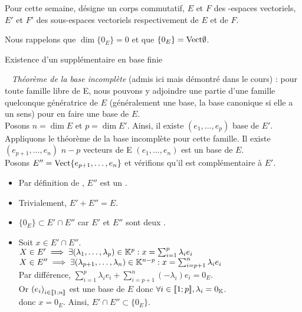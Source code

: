 \documentclass{article}
\date{22 Avril 2024}
\begin{document}
	\maketitle
	
	Pour cette semaine, \K désigne un corps commutatif, $E$ et $F$ des \K\!\!-espaces vectoriels, $E'$ et $F'$ des sous-espaces vectoriels respectivement de $E$ et de $F$.
	
	Nous rappelons que $\dim \{0_E\} = 0$ et que $\{0_E\} = \text{Vect} \emptyset$.
	
	\begin{question_kholle}
		{Existence d'un supplémentaire en base finie}
		
		~\newline
		\textit{Théorème de la base incomplète} (admis ici mais démontré dans le cours) : pour toute famille libre de E, nous pouvons y adjoindre une partie d'une famille quelconque génératrice de $E$ (généralement une base, la base canonique si elle a un sens) pour en faire une base de $E$. \\
		
		Posons $n = \dim E$ et $p = \dim E'$. Ainsi, il existe $(e_1, \ldots, e_p)$ base de $E'$. \\
		Appliquons le théorème de la base incomplète pour cette famille. Il existe $(e_{p+1}, \ldots, e_n)$ $n-p$ vecteurs de E \tq $(e_1, \ldots, e_n)$ est un base de $E$. \\
		Posons $E'' = \text{Vect} \{ e_{p+1}, \ldots, e_n \}$ et vérifions qu'il est complémentaire à $E'$.
		
		\begin{itemize}[label=$*$]
			\item Par définition de \Vect\!\!, $E''$ est un \sev.
			\item Trivialement, $E' + E'' = E$.
			\item $\{0_E\} \subset E' \cap E''$ car $E'$ et $E''$ sont deux \sevs.
			\item Soit $x \in E' \cap E''$. \\
			$X \in E' \implies \exists (\lambda_1, \ldots, \lambda_p) \in \mathbb K^p : x = \sum_{i=1}^{p} \lambda_i e_i$ \\
			$X \in E'' \implies \exists (\lambda_{p+1}, \ldots, \lambda_n) \in \mathbb K^{n-p} : x = \sum_{i=p+1}^{n} \lambda_i e_i$ \\
			Par différence, $\sum_{i=1}^{p} \lambda_i e_i + \sum_{i=p+1}^{n} \left(-\lambda_i\right) e_i = 0_E$. \\
			Or $\left(e_i\right)_{i \in [\![ 1 ; n ]\!]}$ est une base de $E$ donc $\forall i \in [\![ 1 ; p ]\!], \lambda_i = 0_{\mathbb K}$. \\
			donc $x = 0_E$.
			Ainsi, $E' \cap E'' \subset \{0_E\}$.
		\end{itemize}
	\end{question_kholle}
	
\end{document}
